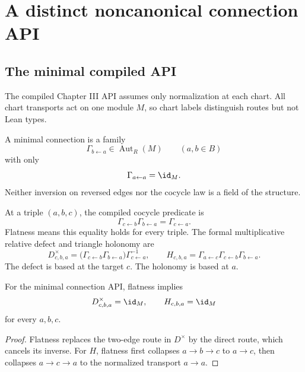 \section{A distinct noncanonical connection API}
\label{sec:connection}

\subsection{The minimal compiled API}

The compiled Chapter III API assumes only normalization at each chart.  All
chart transports act on one module $M$, so chart labels distinguish routes
but not Lean types.

\begin{definition}
\label{def:minimal-connection}
A minimal connection is a family
\[
\Gamma_{b\leftarrow a}\in\operatorname{Aut}_R(M)
\qquad(a,b\in B)
\]
with only
\[
\Gamma_{a\leftarrow a}=\id_M.
\]
Neither inversion on reversed edges nor the cocycle law is a field of the
structure.
\end{definition}

At a triple $(a,b,c)$, the compiled cocycle predicate is
\[
\Gamma_{c\leftarrow b}\Gamma_{b\leftarrow a}
=\Gamma_{c\leftarrow a}.
\]
Flatness means this equality holds for every triple.  The formal
multiplicative relative defect and triangle holonomy are
\[
D^\times_{c,b,a}
=
\bigl(\Gamma_{c\leftarrow b}\Gamma_{b\leftarrow a}\bigr)
\Gamma_{c\leftarrow a}^{-1},
\qquad
H_{c,b,a}
=
\Gamma_{a\leftarrow c}
\Gamma_{c\leftarrow b}
\Gamma_{b\leftarrow a}.
\]
The defect is based at the target $c$.  The holonomy is based at $a$.

\begin{theorem}
\label{thm:minimal-flatness}
For the minimal connection API, flatness implies
\[
D^\times_{c,b,a}=\id_M,
\qquad
H_{c,b,a}=\id_M
\]
for every $a,b,c$.
\end{theorem}

\begin{proof}
Flatness replaces the two-edge route in $D^\times$ by the direct route,
which cancels its inverse.  For $H$, flatness first collapses $a\to b\to c$
to $a\to c$, then collapses $a\to c\to a$ to the normalized transport
$a\to a$.
\end{proof}

